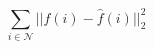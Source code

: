 \documentclass[12pt,a4paper]{article}
\begin{document}
\thispagestyle{empty}
$$
    \sum_{i \in \mathcal{N}} ||f(i) - \hat{f}(i)||^2_2
$$
\end{document}
